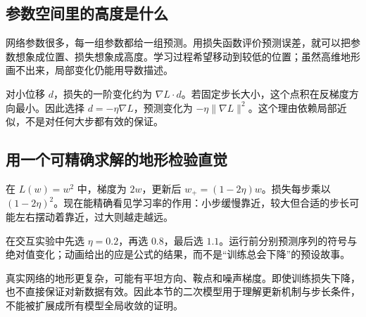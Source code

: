 \subsection*{参数空间里的高度是什么}
网络参数很多，每一组参数都给一组预测。用损失函数评价预测误差，就可以把参数想象成位置、损失想象成高度。学习过程希望移动到较低的位置；虽然高维地形画不出来，局部变化仍能用导数描述。

对小位移 $d$，损失的一阶变化约为 $\nabla L\cdot d$。若固定步长大小，这个点积在反梯度方向最小。因此选择 $d=-\eta\nabla L$，预测变化为 $-\eta\|\nabla L\|^2$。这个理由依赖局部近似，不是对任何大步都有效的保证。

\subsection*{用一个可精确求解的地形检验直觉}
在 $L(w)=w^2$ 中，梯度为 $2w$，更新后 $w_+=(1-2\eta)w$。损失每步乘以 $(1-2\eta)^2$。现在能精确看见学习率的作用：小步缓慢靠近，较大但合适的步长可能左右摆动着靠近，过大则越走越远。

在交互实验中先选 $\eta=0.2$，再选 $0.8$，最后选 $1.1$。运行前分别预测序列的符号与绝对值变化；动画给出的应是公式的结果，而不是“训练总会下降”的预设故事。

真实网络的地形更复杂，可能有平坦方向、鞍点和噪声梯度。即使训练损失下降，也不直接保证对新数据有效。因此本节的二次模型用于理解更新机制与步长条件，不能被扩展成所有模型全局收敛的证明。
